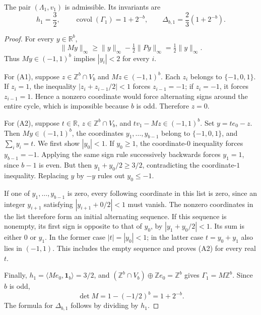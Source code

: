 \documentclass[12pt]{article}
\newcommand{\Z}{\mathbb{Z}}
\newcommand{\R}{\mathbb{R}}
\newcommand{\covol}{\operatorname{covol}}
\newcommand{\one}{\mathbf{1}}
\newcommand{\Lat}{\Lambda}
\begin{document}
\begin{lemma}\label{lem:base-pair}
The pair $(\Lat_1,v_1)$ is admissible. Its invariants are
\[
 h_1=\frac32,\qquad
 \covol(\Gamma_1)=1+2^{-b},\qquad
 \Delta_{b,1}=\frac23(1+2^{-b}).
\]
\end{lemma}
\begin{proof}
For every $y\in\R^b$,
\[
 \lVert My\rVert_\infty
 \ge \lVert y\rVert_\infty-\tfrac12\lVert Py\rVert_\infty
 =\tfrac12\lVert y\rVert_\infty.
\]
Thus $My\in(-1,1)^b$ implies $|y_i|<2$ for every $i$.

For (A1), suppose $z\in\Z^b\cap V_b$ and $Mz\in(-1,1)^b$.
Each $z_i$ belongs to $\{-1,0,1\}$. If $z_i=1$, the inequality
$|z_i+z_{i-1}/2|<1$ forces $z_{i-1}=-1$; if $z_i=-1$, it forces
$z_{i-1}=1$. Hence a nonzero coordinate would force alternating signs
around the entire cycle, which is impossible because $b$ is odd.
Therefore $z=0$.

For (A2), suppose $t\in\R$, $z\in\Z^b\cap V_b$, and
$tv_1-Mz\in(-1,1)^b$. Set $y=te_0-z$. Then $My\in(-1,1)^b$,
the coordinates $y_1,\dots,y_{b-1}$ belong to $\{-1,0,1\}$, and
$\sum_i y_i=t$.
We first show $|y_0|<1$. If $y_0\ge1$, the coordinate-$0$ inequality
forces $y_{b-1}=-1$. Applying the same sign rule successively backwards
forces $y_1=1$, since $b-1$ is even. But then
$y_1+y_0/2\ge3/2$, contradicting the coordinate-$1$ inequality.
Replacing $y$ by $-y$ rules out $y_0\le-1$.

If one of $y_1,\dots,y_{b-1}$ is zero, every following coordinate in
this list is zero, since an integer $y_{i+1}$ satisfying
$|y_{i+1}+0/2|<1$ must vanish. The nonzero coordinates in the list
therefore form an initial alternating sequence. If this sequence is
nonempty, its first sign is opposite to that of $y_0$, by
$|y_1+y_0/2|<1$. Its sum is either $0$ or $y_1$. In the former case
$|t|=|y_0|<1$; in the latter case $t=y_0+y_1$ also lies in $(-1,1)$.
This includes the empty sequence and proves (A2) for every real $t$.

Finally, $h_1=\langle Me_0,\one_b\rangle=3/2$, and
$(\Z^b\cap V_b)\oplus\Z e_0=\Z^b$ gives $\Gamma_1=M\Z^b$.
Since $b$ is odd,
\[
 \det M=1-(-1/2)^b=1+2^{-b}.
\]
The formula for $\Delta_{b,1}$ follows by dividing by $h_1$.
\end{proof}
\end{document}
